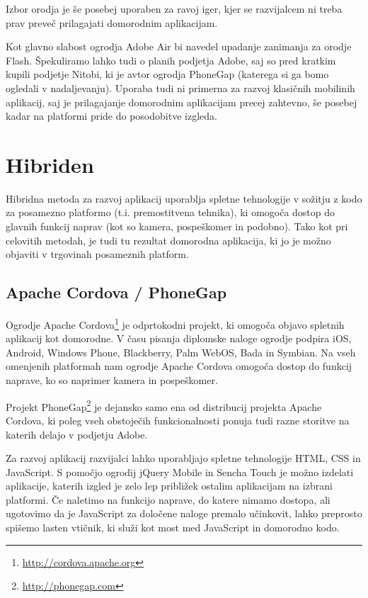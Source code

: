 Izbor orodja je še posebej uporaben za ravoj iger, kjer se razvijalcem ni treba prav preveč prilagajati domorodnim aplikacijam.

Kot glavno slabost ogrodja Adobe Air bi navedel upadanje zanimanja za orodje Flash. Špekuliramo lahko tudi o planih podjetja Adobe, saj so pred kratkim kupili podjetje Nitobi, ki je avtor ogrodja PhoneGap (katerega si ga bomo ogledali v nadaljevanju). Uporaba tudi ni primerna za razvoj klasičnih mobilinih aplikacij, saj je prilagajanje domorodnim aplikacijam precej zahtevno, še posebej kadar na platformi pride do posodobitve izgleda.

\section{Hibriden}

Hibridna metoda za razvoj aplikacij uporablja spletne tehnologije v sožitju z kodo za posamezno platformo (t.i. premostitvena tehnika), ki omogoča dostop do glavnih funkcij naprav (kot so kamera, pospeškomer in podobno). Tako kot pri celovitih metodah, je tudi tu rezultat domorodna aplikacija, ki jo je možno objaviti v trgovinah posameznih platform.

\subsection{Apache Cordova / PhoneGap}

Ogrodje Apache Cordova\footnote{\href{http://cordova.apache.org}{http://cordova.apache.org}} je odprtokodni projekt, ki omogoča objavo spletnih aplikacij kot domorodne. V času pisanja diplomske naloge ogrodje podpira iOS, Android, Windows Phone, Blackberry, Palm WebOS, Bada in Symbian. Na vseh omenjenih platformah nam ogrodje Apache Cordova omogoča dostop do funkcij naprave, ko so naprimer kamera in pospeškomer. 

Projekt PhoneGap\footnote{\href{http://phonegap.com}{http://phonegap.com}} je dejansko samo ena od distribucij projekta Apache Cordova, ki poleg vseh obstoječih funkcionalnosti ponuja tudi razne storitve na katerih delajo v podjetju Adobe.

Za razvoj aplikacij razvijalci lahko uporabljajo spletne tehnologije HTML, CSS in JavaScript. S pomočjo ogrodij jQuery Mobile in Sencha Touch je možno izdelati aplikacije, katerih izgled je zelo lep približek ostalim aplikacijam na izbrani platformi. Če naletimo na funkcijo naprave, do katere nimamo dostopa, ali ugotovimo da je JavaScript za določene naloge premalo učinkovit, lahko preprosto spišemo lasten vtičnik, ki služi kot most med JavaScript in domorodno kodo.

